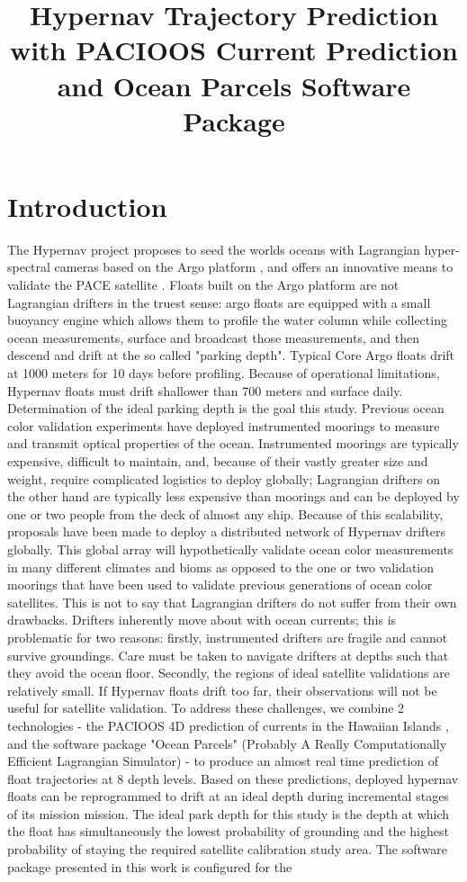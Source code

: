 \documentclass{ametsocV5}
\title{Hypernav Trajectory Prediction with PACIOOS Current Prediction and Ocean Parcels Software Package}
\affiliation{Scripps Institution of Oceanography, 
La Jolla, California}
\begin{document}
\maketitle
\section{Introduction}
The Hypernav project proposes to seed the worlds oceans with Lagrangian hyper-spectral cameras based on the Argo platform \citep{roemmich2019future}, and offers an innovative means to validate the PACE satellite \citep{frouin2019atmospheric}. Floats built on the Argo platform are not Lagrangian drifters in the truest sense: argo floats are equipped with a small buoyancy engine which allows them to profile the water column while collecting ocean measurements, surface and broadcast those measurements, and then descend and drift at the so called "parking depth". Typical Core Argo floats drift at 1000 meters for 10 days before profiling. Because of operational limitations, Hypernav floats must drift shallower than 700 meters and surface daily. Determination of the ideal parking depth is the goal this study. Previous ocean color validation experiments have deployed instrumented moorings \citep{clark2003moby} to measure and transmit optical properties of the ocean. Instrumented moorings are typically expensive, difficult to maintain, and, because of their vastly greater size and weight, require complicated logistics to deploy globally; Lagrangian drifters on the other hand are typically less expensive than moorings and can be deployed by one or two people from the deck of almost any ship. Because of this scalability, proposals have been made to deploy a distributed network of Hypernav drifters globally. This global array will hypothetically validate ocean color measurements in many different climates and bioms as opposed to the one or two validation moorings that have been used to validate previous generations of ocean color satellites. This is not to say that Lagrangian drifters do not suffer from their own drawbacks. Drifters inherently move about with ocean currents; this is problematic for two reasons: firstly, instrumented drifters are fragile and cannot survive groundings. Care must be taken to navigate drifters at depths such that they avoid the ocean floor. Secondly, the regions of ideal satellite validations are relatively small. If Hypernav floats drift too far, their observations will not be useful for satellite validation. To address these challenges, we combine 2 technologies - the PACIOOS 4D prediction of currents in the Hawaiian Islands \citep{PacIOOS}, and the software package "Ocean Parcels" (Probably A Really Computationally Efficient Lagrangian Simulator)\citep{delandmeter2019parcels,Parcels} - to produce an almost real time prediction of float trajectories at 8 depth levels. Based on these predictions, deployed hypernav floats can be reprogrammed to drift at an ideal depth during incremental stages of its mission mission. The ideal park depth for this study is the depth at which the float has simultaneously the lowest probability of grounding and the highest probability of staying the required satellite calibration study area. The software package presented in this work is configured for the 
\end{document}
